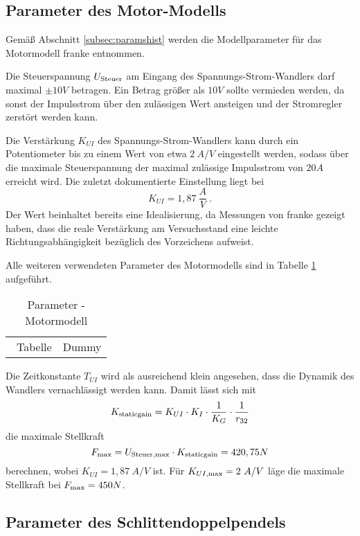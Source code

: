 \subsection{Parameter des Motor-Modells}\label{subsec:motorparams}

Gemäß Abschnitt \ref{subsec:paramshist} werden die Modellparameter für das Motormodell franke \cite{franke} entnommen. 

Die Steuerspannung $U_{\mathrm{Steuer}}$ am Eingang des Spannungs-Strom-Wandlers darf maximal $\pm10 V$ betragen. Ein Betrag größer als $10 V$ sollte vermieden werden, da sonst der Impulsstrom über den zulässigen Wert ansteigen und der Stromregler zerstört werden kann.

Die Verstärkung $K_{UI}$ des Spannungs-Strom-Wandlers kann durch ein Potentiometer bis zu einem Wert von etwa $2 \ A/V$ eingestellt werden, sodass über die maximale Steuerspannung der maximal zulässige Impulsstrom von $20A$ erreicht wird. Die zuletzt dokumentierte Einstellung liegt bei
\[
	K_{UI} = 1,87 \ \frac{A}{V} \ .
\]
Der Wert beinhaltet bereits eine Idealisierung, da Messungen von franke \cite{franke} gezeigt haben, dass die reale Verstärkung am Versuchsstand eine leichte Richtungsabhängigkeit bezüglich des Vorzeichens aufweist.

Alle weiteren verwendeten Parameter des Motormodells sind in Tabelle \ref{tab:motorparams} aufgeführt.

\begin{table}[h]
	\centering
		\begin{tabular}[t]{cc} \
					Tabelle & Dummy \\
		\end{tabular}
	\caption{Parameter - Motormodell}
	\label{tab:motorparams}
\end{table}

Die Zeitkonstante $T_{UI}$ wird als ausreichend klein angesehen, dass die Dynamik des Wandlers vernachlässigt werden kann.
Damit lässt sich mit
\[
	K_{\mathrm{staticgain}} = K_{UI} \cdot K_I \cdot \frac{1}{K_G} \cdot \frac{1}{r_{32}}
\]
 die maximale Stellkraft
\[
	F_{\mathrm{max}} = U_{\mathrm{Steuer, max}} \cdot K_{\mathrm{staticgain}} = 420,75 N
\]
berechnen, wobei $K_{UI} = 1,87 \ A/V$ ist.
Für $K_{UI \mathrm{, max}} = 2 \ A/V$ läge die maximale Stellkraft bei $F_{\mathrm{max}} = 450N$.



\subsection{Parameter des Schlittendoppelpendels}\label{subsec:spdparams}


